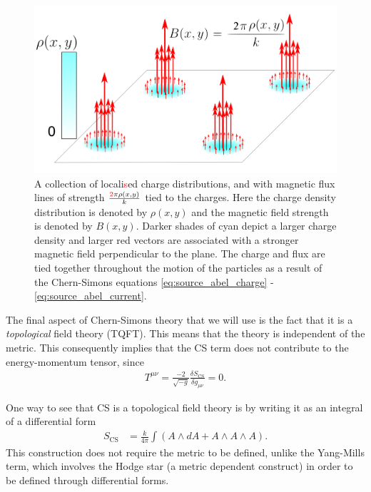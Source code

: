 \begin{figure}[htb]
	\centering
		\includegraphics[scale=0.17]{Background_Folder/figures/Flux_Attachment_3.pdf}
    \caption[This figure depicts magnetic flux attachment.]{A collection of locali\textcolor{red}{s}ed charge distributions, and with magnetic flux lines of strength $\frac{\textcolor{red}{2} \pi \rho(x,y)}{k}$ tied to the charges. Here the charge density distribution is denoted by $\rho(x,y)$ and the magnetic field strength is denoted by $B(x,y)$. Darker shades of cyan depict a larger charge density and larger red vectors are associated with a stronger magnetic field perpendicular to the plane.  The charge and flux are tied together throughout the motion of the particles as a result of the Chern-Simons equations \eqref{eq:source_abel_charge} - \eqref{eq:source_abel_current}.} \label{fig:flux_attachment}
\end{figure}

The final aspect of Chern-Simons theory that we will use is the fact that it is a \textit{topological} field theory (TQFT). This means that the theory is independent of the metric. This consequently implies that the CS term does not contribute to the energy-momentum tensor, since
\begin{align}
    T^{\mu \nu} = \frac{-2}{ \sqrt{-g}} \frac{\delta S_{\text{CS}}}{ \delta g_{\mu\nu}} =0.
\end{align}

One way to see that CS is a topological field theory is by writing it as an integral of a differential form
\begin{align}
    S_{\text{CS}} &= \frac{k}{4 \pi} \int \left(A \wedge dA +A \wedge A \wedge A\right).
\end{align}
This construction does not require the metric to be defined, unlike the Yang-Mills term, which involves the Hodge star (a metric dependent construct) in order to be defined through differential forms.

